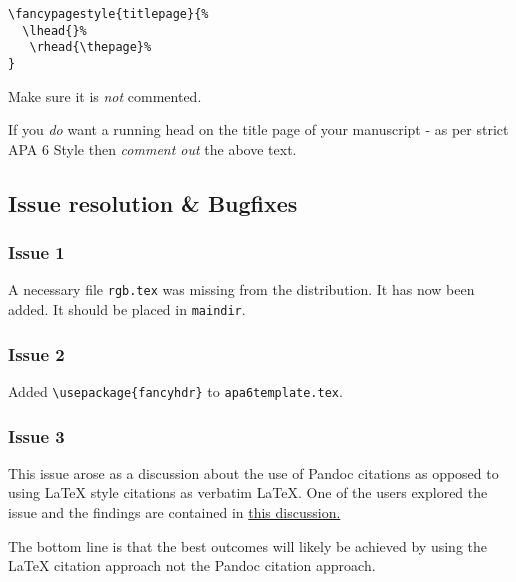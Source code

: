 \documentclass{easychair}
\begin{document}
\begin{verbatim}
\fancypagestyle{titlepage}{%
  \lhead{}%
   \rhead{\thepage}%
}
\end{verbatim}

Make sure it is \emph{not} commented.

If you \emph{do} want a running head on the title page of your
manuscript - as per strict APA 6 Style then \emph{comment out} the above
text.

\subsection{Issue resolution \&
Bugfixes}\label{issue-resolution-bugfixes}

\subsubsection{Issue 1}\label{issue-1}

A necessary file \texttt{rgb.tex} was missing from the distribution. It
has now been added. It should be placed in \texttt{maindir}.

\subsubsection{Issue 2}\label{issue-2}

Added \texttt{\textbackslash{}usepackage\{fancyhdr\}} to
\texttt{apa6template.tex}.

\subsubsection{Issue 3}\label{issue-3}

This issue arose as a discussion about the use of Pandoc citations as
opposed to using LaTeX style citations as verbatim LaTeX. One of the
users explored the issue and the findings are contained in
\href{https://bitbucket.org/zuline/md2latex/issue/3/pandoc-citations-not-supported}{this
discussion.}

The bottom line is that the best outcomes will likely be achieved by
using the LaTeX citation approach not the Pandoc citation approach.

\label{sect:bib}
%
%
%
%
%

%

\end{document}
